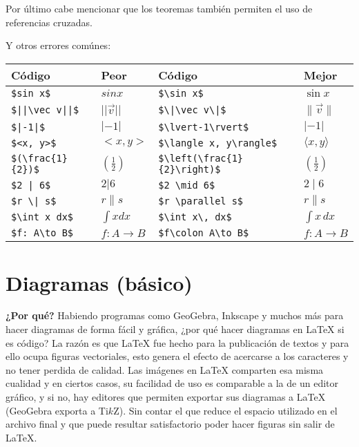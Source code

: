 \documentclass[intro-breve-latex.tex]{subfiles}
\begin{document}
Por último cabe mencionar que los teoremas también permiten el uso de referencias cruzadas.

Y otros errores comúnes:
\begin{longtable}{|ll|ll|}
	\hline
	Código & Peor & Código & Mejor \\
	\hline
	\endhead

	\hline
	\endfoot

	\lstinline|$sin x$| & $sin x$ & \lstinline|$\sin x$| & $\sin x$ \\
	\lstinline?$||\vec v||$? & $||\vec v||$ & \lstinline?$\|\vec v\|$? & $\|\vec v\|$ \\
	\lstinline?$|-1|$? & $|-1|$ & \lstinline|$\lvert-1\rvert$| & $\lvert-1\rvert$ \\
	\lstinline?$<x, y>$? & $<x, y>$ & \lstinline?$\langle x, y\rangle$? & $\langle x, y\rangle$ \\
	\lstinline?$(\frac{1}{2})$? & $\displaystyle (\frac{1}{2}) $ & \lstinline|$\left(\frac{1}{2}\right)$| & $\displaystyle \left(\frac{1}{2}\right) $ \\
	\lstinline?$2 | 6$? & $2 | 6$ & \lstinline|$2 \mid 6$| & $2 \mid 6$ \\
	\lstinline?$r \| s$? & $r \| s$ & \lstinline|$r \parallel s$| & $r \parallel s$ \\
	\lstinline|$\int x dx$| & $\int x dx$ & \lstinline|$\int x\, dx$| & $\int x\, dx$ \\
	\lstinline|$f: A\to B$| & $f: A\to B$ & \lstinline|$f\colon A\to B$| & $f\colon A\to B$ \\
\end{longtable}

\section{Diagramas (básico)}
\textbf{¿Por qué?} Habiendo programas como GeoGebra, Inkscape y muchos más para hacer diagramas de forma fácil y gráfica, ¿por qué hacer diagramas en \LaTeX{} si es código?
La razón es que \LaTeX{} fue hecho para la publicación de textos y para ello ocupa figuras vectoriales, esto genera el efecto de acercarse a los caracteres y no tener perdida de calidad.
Las imágenes en \LaTeX{} comparten esa misma cualidad y en ciertos casos, su facilidad de uso es comparable a la de un editor gráfico, y si no, hay editores que permiten exportar sus diagramas a \LaTeX{} (GeoGebra exporta a Ti$k$Z).
Sin contar el que reduce el espacio utilizado en el archivo final y que puede resultar satisfactorio poder hacer figuras sin salir de \LaTeX{}.
\end{document}

